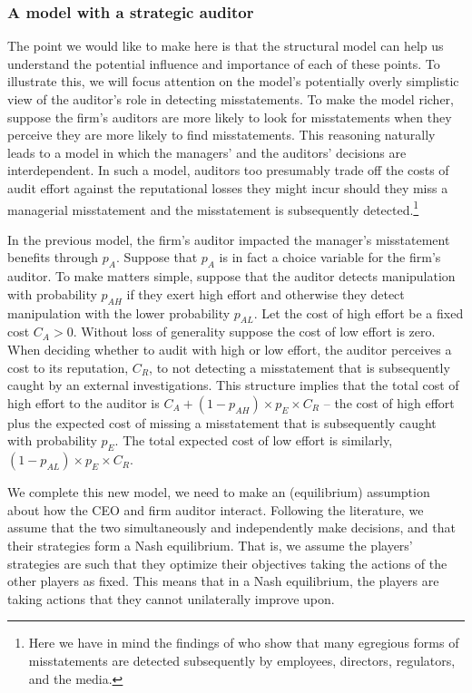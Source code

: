 \subsubsection{A model with a strategic auditor}

The point we would like to make here is that the structural model can help us understand the potential influence and importance of each of these points. 
To illustrate this, we will focus attention on the model's potentially overly simplistic view of the auditor's role in detecting misstatements.  
To make the model richer, suppose the firm's  auditors are more likely to look for misstatements when they perceive they are more likely to find misstatements. 
This reasoning naturally leads to a model in which the managers' and the auditors' decisions are interdependent.
In such a model, auditors too presumably trade off the costs of audit effort against the reputational losses they might incur should they miss a managerial misstatement and the misstatement is subsequently detected.\footnote{
Here we have in mind the findings of \citet{Dyck:2010kh} who show that many egregious forms of misstatements are detected subsequently by employees, directors, regulators, and the media.} 

In the previous model, the firm's auditor impacted the manager's misstatement benefits through $p_A$. 
Suppose that $p_A$ is in fact a choice variable for the firm's auditor. 
To make matters simple, suppose that the auditor detects manipulation with probability $p_{AH}$ if they exert high effort and  otherwise they detect manipulation with the lower probability $p_{AL}$. 
Let the cost of high effort be a fixed cost $C_A > 0$. 
Without loss of generality suppose the cost of low effort is zero. 
When deciding whether to audit with high or low effort, the auditor perceives a cost to its reputation, $C_R$, to not detecting a misstatement that is subsequently caught by an external investigations. 
This structure implies that the total cost of high effort to the auditor is $C_A + (1-p_{AH}) \times p_E \times C_R$ -- the cost of high effort plus the expected cost of missing a misstatement that is subsequently caught with probability $p_E$. 
The total expected cost of
low effort is similarly, $(1-p_{AL}) \times p_E \times C_R$. 

We complete this new model, we need to make an (equilibrium) assumption about how the CEO and firm auditor interact. Following the literature, we assume that the two simultaneously
and independently make decisions, and that their strategies form a Nash equilibrium.
That is, we assume the players' strategies are such that they optimize their objectives 
taking the actions of the other players as fixed. This means that in a Nash equilibrium, 
the players are taking actions that they cannot unilaterally improve upon.

